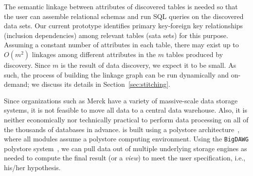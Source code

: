 
The semantic linkage between attributes of discovered tables is needed so that the user can assemble relational schemas and run 
 \textsf{SQL} queries on the discovered data sets. 
%
Our current prototype identifies
primary key-foreign key relationships (inclusion dependencies) among relevant tables (sata sets) for this purpose.
Assuming a constant number of attributes in each table, there may exist up to $O(m^2)$ linkages among different attributes in the $m$ tables produced by discovery.
%
Since $m$ is the result of data discovery, we expect it to be small.
As such, the process of building the linkage graph can be run dynamically and on-demand; we discuss its details in Section~\ref{sec:stitching}.



Since organizations such as  Merck have a variety of massive-scale data storage systems, it is not feasible to move all data to a central data warehouse. Also, it is neither economically nor technically practical to perform data processing on all of the thousands of databases in advance. 
\dcv is built using a polystore architecture~\cite{DBLP:journals/sigmod/DugganESBHKMMMZ15}, where all modules assume a polystore computing environment.
Using the \texttt{BigDAWG} polystore system~\cite{DBLP:journals/pvldb/ElmoreDSBCGHHKK15}, we can pull data out of multiple underlying storage engines as needed to compute the final result (or a {\em view}) to meet the user specification, i.e., his/her hypothesis. 

